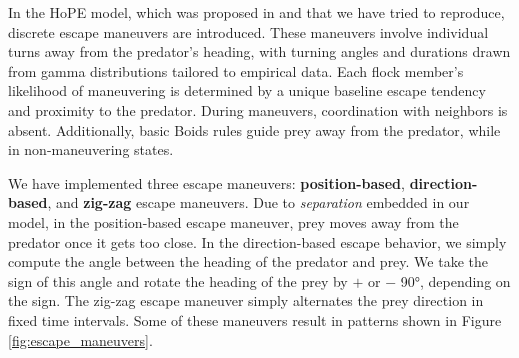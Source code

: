 \documentclass[9pt]{pnas-new}
\begin{document}
In the HoPE model, which was proposed in \cite{papadopoulou2022emergence} and that we have tried to
reproduce, discrete escape maneuvers are introduced. These maneuvers involve individual turns away from
the predator's heading, with turning angles and durations drawn from gamma distributions tailored to empirical
data. Each flock member's likelihood of maneuvering is determined by a unique baseline escape tendency and
proximity to the predator. During maneuvers, coordination with neighbors is absent. Additionally, basic Boids
rules guide prey away from the predator, while in non-maneuvering states.

We have implemented three escape maneuvers: \textbf{position-based}, \textbf{direction-based}, and \textbf{zig-zag}
escape maneuvers. Due to \textit{separation} embedded in our model, in the position-based escape maneuver, prey moves
away from the predator once it gets too close. In the direction-based escape behavior, we simply compute the angle
between the heading of the predator and prey. We take the sign of this angle and rotate the heading of the prey by
$+$ or $-$ 90°, depending on the sign. The zig-zag escape maneuver simply alternates the prey direction in fixed
time intervals. Some of these maneuvers result in patterns shown in Figure \ref{fig:escape_maneuvers}.
\end{document}
